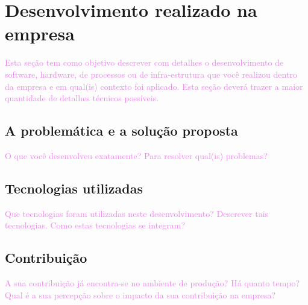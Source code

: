 \section{Desenvolvimento realizado na empresa}
\label{sec:desenvolvimento}

\textcolor{violet}{Esta seção tem como objetivo descrever com detalhes o desenvolvimento de software, hardware, de processos ou de infra-estrutura que você realizou dentro da empresa e em qual(is) contexto foi aplicado.  Esta seção deverá trazer a maior quantidade de detalhes técnicos possíveis.}

\subsection{A problemática e a solução proposta}
\textcolor{violet}{O que você desenvolveu exatamente? Para resolver qual(is) problemas?}

\subsection{Tecnologias utilizadas} 
\textcolor{violet}{Que tecnologias foram utilizadas neste desenvolvimento?}
\textcolor{violet}{Descrever tais tecnologias.  Como estas tecnologias se integram?}
 
\subsection{Contribuição}
\textcolor{violet}{A sua contribuição já encontra-se no ambiente de produção? Há quanto tempo? Qual é a sua percepção sobre o impacto da sua contribuição na empresa?}
